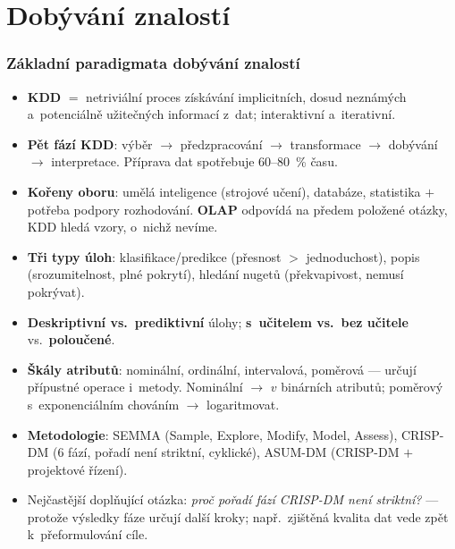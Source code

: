 \documentclass[11pt,a4paper]{article}
\theoremstyle{definition}
\begin{document}
\part{Dobývání znalostí}
\setcounter{section}{0}

\section{Základní paradigmata dobývání znalostí}
\begin{itemize}
\item \textbf{KDD} $=$ netriviální proces získávání implicitních, dosud neznámých
 a~potenciálně užitečných informací z~dat; interaktivní a~iterativní.
\item \textbf{Pět fází KDD}: výběr $\to$ předzpracování $\to$ transformace $\to$ dobývání
 $\to$ interpretace. Příprava dat spotřebuje 60--80~\% času.
\item \textbf{Kořeny oboru}: umělá inteligence (strojové učení), databáze, statistika
 $+$ potřeba podpory rozhodování. \textbf{OLAP} odpovídá na předem položené otázky,
 KDD hledá vzory, o~nichž nevíme.
\item \textbf{Tři typy úloh}: klasifikace/predikce (přesnost $>$ jednoduchost), popis
 (srozumitelnost, plné pokrytí), hledání nugetů (překvapivost, nemusí pokrývat).
\item \textbf{Deskriptivní vs.\ prediktivní} úlohy; \textbf{s~učitelem vs.\ bez učitele}
 vs.\ \textbf{poloučené}.
\item \textbf{Škály atributů}: nominální, ordinální, intervalová, poměrová --- určují
 přípustné operace i~metody. Nominální $\to$ $v$ binárních atributů; poměrový
 s~exponenciálním chováním $\to$ logaritmovat.
\item \textbf{Metodologie}: SEMMA (Sample, Explore, Modify, Model, Assess), CRISP-DM
 (6 fází, pořadí není striktní, cyklické), ASUM-DM (CRISP-DM $+$ projektové řízení).
\item Nejčastější doplňující otázka: \emph{proč pořadí fází CRISP-DM není striktní?} ---
 protože výsledky fáze určují další kroky; např.\ zjištěná kvalita dat vede zpět
 k~přeformulování cíle.
\end{itemize}
\end{document}
